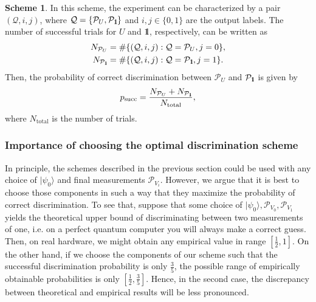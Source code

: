 \documentclass[preprint,12pt, a4paper, dvipsnames]{elsarticle}
\newcommand{\ket}[1]{\ensuremath{|#1\rangle}}
\newcommand{\1}{{\rm 1\hspace{-0.9mm}l}}
\newcommand{\Id}{{\rm 1\hspace{-0.9mm}l}}
\newcommand{\PP}{\mathcal{P}}
\theoremstyle{definition}
\newtheorem{scheme}{Scheme}
\begin{document}
\begin{scheme}
	In this scheme, the experiment can be characterized by a pair $(\mathcal{Q}, i,j)$, where
	$\mathcal{Q} = \{ \PP_{U}, \PP_{\Id} \}$ and $i,j \in \{0,1\}$ are the output labels. The number of successful trials for $U$ and $\Id$,
	respectively, can be written  as
	\begin{eqnarray}
	N_{\PP_U} &= \#\{(\mathcal{Q},  i, j): \mathcal{Q} = \PP_U, j = 0\}, \\
	N_{\PP_\Id} &= \#\{(\mathcal{Q},  i, j): \mathcal{Q} = \PP_\Id, j = 1\}.
	\end{eqnarray}
	Then, the probability of correct discrimination between $\PP_{U} $ and $\PP_\Id$ is given by
	\begin{equation}
	p_{\text{succ}} = \frac{N_{\PP_{U}} + N_{\PP_{\Id}}}{N_{\text{total}}},
	\end{equation}
	where $N_{\text{total}}$ is the number of trials.
\end{scheme}


\subsubsection{Importance of choosing the optimal discrimination scheme}
In principle, the schemes described in the previous section could be used with any choice of
$\ket{\psi_0}$ and final measurements $\PP_{V_i}$. However, we argue that it is best to choose those
components in such a way that they maximize the probability of correct discrimination. To see that,
suppose that some choice of $\ket{\psi_0}, \PP_{V_0}, \PP_{V_1}$ yields the theoretical upper bound
of discriminating between two measurements of one, i.e. on a perfect quantum computer you will always
make a correct guess. Then, on real hardware, we might obtain any empirical value in range $\left[\frac{1}{2},
1\right]$. On the other hand, if we choose the components of our scheme such that the successful
discrimination probability is only $\frac{3}{5}$, the possible range of empirically obtainable probabilities
is only $\left[\frac{1}{2}, \frac{3}{5}\right]$. Hence, in the second case, the discrepancy between theoretical and empirical
results will be less pronounced.
\end{document}
